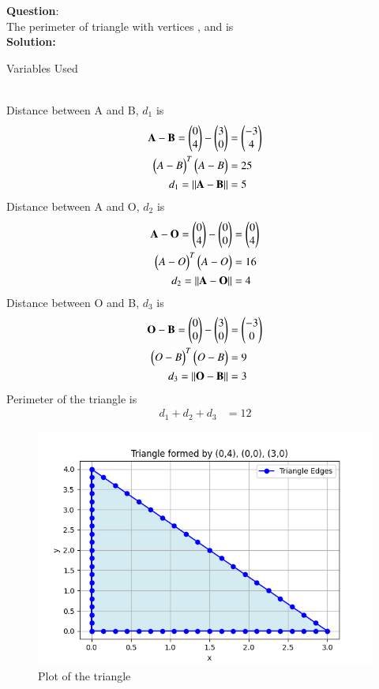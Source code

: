 \documentclass[journal]{IEEEtran}
\begin{document}
\textbf{Question}:\\
The perimeter of triangle with vertices , and  is
\\
\textbf{Solution: }
\begin{table}[h!]    
  \centering
  
  \caption{Variables Used}
  \label{tab10.5.3.9.1}
\end{table}\\
Distance between A and B, $d_1$ is
\begin{align}
    \mathbf{A} - \mathbf{B} = \begin{pmatrix}0\\4\end{pmatrix} - \begin{pmatrix}3\\0\end{pmatrix} &= \begin{pmatrix}-3\\4\end{pmatrix}\\
    \begin{pmatrix}A-B\end{pmatrix}^T\begin{pmatrix}A-B\end{pmatrix}&=25\\
    d_1=||\mathbf{A}-\mathbf{B}||&=5
\end{align}
Distance between A and O, $d_2$ is
\begin{align}
    \mathbf{A} - \mathbf{O} = \begin{pmatrix}0\\4\end{pmatrix} - \begin{pmatrix}0\\0\end{pmatrix} &= \begin{pmatrix}0\\4\end{pmatrix}\\
    \begin{pmatrix}A-O\end{pmatrix}^T\begin{pmatrix}A-O\end{pmatrix}&=16\\
    d_2=||\mathbf{A}-\mathbf{O}||&=4
\end{align}
Distance between O and B, $d_3$ is
\begin{align}
    \mathbf{O} - \mathbf{B} = \begin{pmatrix}0\\0\end{pmatrix} - \begin{pmatrix}3\\0\end{pmatrix} &= \begin{pmatrix}-3\\0\end{pmatrix}\\
    \begin{pmatrix}O-B\end{pmatrix}^T\begin{pmatrix}O-B\end{pmatrix}&=9\\
    d_3=||\mathbf{O}-\mathbf{B}||&=3
\end{align}
Perimeter of the triangle is 
\begin{align}
    d_1+d_2+d_3&=12
\end{align}
\begin{figure}[h!]
   \centering
   \includegraphics[width=0.7\linewidth]{figs/fig.png}
   \caption{Plot of the triangle}
   \label{stemplot}
\end{figure}
\end{document}

